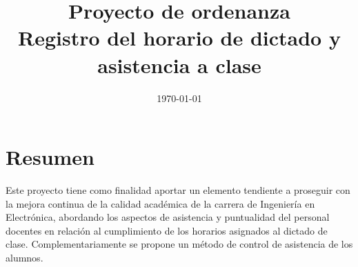 \documentclass[a4paper, 11pt]{article} %
\title{\textbf{Proyecto de ordenanza}\\ %
\Large Registro del horario de dictado y asistencia a clase} %
\author{} %
\date{\today} %
\makeatletter
\renewcommand{\maketitle}{ %
\begin{flushright} %
{\LARGE\@title} %

\vspace{50pt} %


\vspace{40pt} %
\end{flushright}
}
\makeatother
\begin{document}
\maketitle %







\section*{Resumen}
Este proyecto tiene como finalidad aportar un elemento tendiente a proseguir con la mejora continua de la calidad académica de la carrera de Ingeniería en Electrónica, abordando los aspectos de asistencia y puntualidad del personal docentes en relación al cumplimiento de los horarios asignados al dictado de clase. Complementariamente se propone un método de control de asistencia de los alumnos. 
\end{document}
